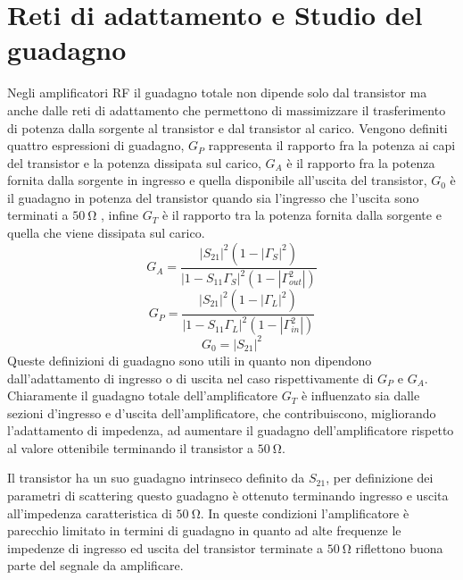 \documentclass[12pt,oneside]{book}
\begin{document}
\section{Reti di adattamento e Studio del guadagno}
Negli amplificatori RF il guadagno totale non dipende solo dal transistor ma anche dalle reti di adattamento che permettono di massimizzare il trasferimento di potenza dalla sorgente al transistor e dal transistor al carico.
Vengono definiti quattro espressioni di guadagno, $G_P$ rappresenta il rapporto fra la potenza ai capi del transistor e la potenza dissipata sul carico,
$G_A$ è il rapporto fra la potenza fornita dalla sorgente in ingresso e quella disponibile all'uscita del transistor, $G_0$ è il guadagno in potenza del transistor quando sia l'ingresso che l'uscita sono terminati a $\SI{50}{\ohm}$ , infine $G_T$ è il rapporto tra la potenza fornita dalla sorgente e quella che viene dissipata sul carico.
\begin{equation}
    G_A = \dfrac{\left|S_{21}\right|^2\left(1-\left|\Gamma_{S}\right|^2\right)}{\left|1-S_{11}\Gamma_{S}\right|^2\left(1-\left|\Gamma_{out}^2\right|\right)}
    \label{av_gain}
\end{equation}
\begin{equation}
    G_P = \dfrac{\left|S_{21}\right|^2\left(1-\left|\Gamma_{L}\right|^2\right)}{\left|1-S_{11}\Gamma_{L}\right|^2\left(1-\left|\Gamma_{in}^2\right|\right)}
    \label{op_gain}
\end{equation}
\begin{equation}
    G_0 = \left|S_{21}\right|^2
\end{equation}
Queste definizioni di guadagno sono utili in quanto non dipendono dall'adattamento di ingresso o di uscita nel caso rispettivamente di $G_P$ e $G_A$. Chiaramente il guadagno totale dell'amplificatore $G_T$ è influenzato sia dalle sezioni d'ingresso e d'uscita dell'amplificatore, che contribuiscono, migliorando l'adattamento di impedenza, ad aumentare il guadagno dell'amplificatore rispetto al valore ottenibile terminando il transistor a $\SI{50}{\ohm}$.

Il transistor ha un suo guadagno intrinseco definito da $S_{21}$, per definizione dei parametri di scattering questo guadagno è ottenuto terminando ingresso e uscita all'impedenza caratteristica di $\SI{50}{\ohm}$. In queste condizioni l'amplificatore è parecchio limitato in termini di guadagno in quanto ad alte frequenze le impedenze di ingresso ed uscita del transistor terminate a $\SI{50}{\ohm}$ riflettono buona parte del segnale da amplificare.
\end{document}
